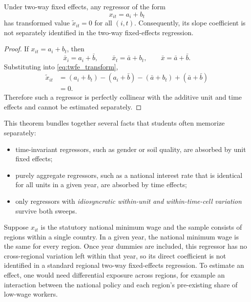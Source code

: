 \begin{thmN}
Under two-way fixed effects, any regressor of the form
\[
x_{it} = a_i + b_t
\]
has transformed value $\tilde{x}_{it}=0$ for all $(i,t)$. Consequently, its slope coefficient is not separately identified in the two-way fixed-effects regression.
\label{thm:twfe_unidentified}
\end{thmN}

\begin{proof}
If $x_{it}=a_i+b_t$, then
\[
\bar{x}_i = a_i + \bar{b},
\qquad
\bar{x}_t = \bar{a} + b_t,
\qquad
\bar{x} = \bar{a}+\bar{b}.
\]
Substituting into \eqref{eq:twfe_transform},
\begin{align*}
\tilde{x}_{it}
&= (a_i+b_t) - (a_i+\bar{b}) - (\bar{a}+b_t) + (\bar{a}+\bar{b}) \\
&= 0.
\end{align*}
Therefore such a regressor is perfectly collinear with the additive unit and time effects and cannot be estimated separately.
\end{proof}

This theorem bundles together several facts that students often memorize separately:
\begin{itemize}
\item time-invariant regressors, such as gender or soil quality, are absorbed by unit fixed effects;
\item purely aggregate regressors, such as a national interest rate that is identical for all units in a given year, are absorbed by time effects;
\item only regressors with \emph{idiosyncratic within-unit and within-time-cell variation} survive both sweeps.
\end{itemize}

\begin{exmp}
Suppose $x_{it}$ is the statutory national minimum wage and the sample consists of regions within a single country. In a given year, the national minimum wage is the same for every region. Once year dummies are included, this regressor has no cross-regional variation left within that year, so its direct coefficient is not identified in a standard regional two-way fixed-effects regression. To estimate an effect, one would need differential exposure across regions, for example an interaction between the national policy and each region's pre-existing share of low-wage workers.
\end{exmp}

